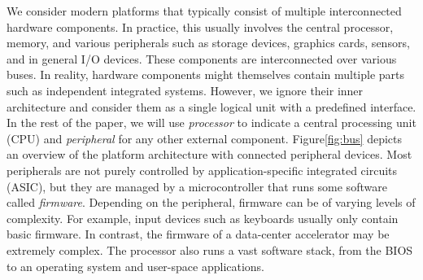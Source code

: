 We consider modern platforms that typically consist of multiple interconnected hardware components. In practice, this usually involves the central processor, memory, and various peripherals such as storage devices, graphics cards, sensors, and in general I/O devices. These components are interconnected over various buses. In reality, hardware components might themselves contain multiple parts such as independent integrated systems. However, we ignore their inner architecture and consider them as a single logical unit with a predefined interface. In the rest of the paper, we will use \emph{processor} to indicate a central processing unit (CPU) and \emph{peripheral} for any other external component. Figure\ref{fig:bus} depicts an overview of the platform architecture with connected peripheral devices. Most peripherals are not purely controlled by application-specific integrated circuits (ASIC), but they are managed by a microcontroller that runs some software called \emph{firmware}. Depending on the peripheral, firmware can be of varying levels of complexity. For example, input devices such as keyboards usually only contain basic firmware. In contrast, the firmware of a data-center accelerator may be extremely complex. The processor also runs a vast software stack, from the BIOS to an operating system and user-space applications. 


% 

